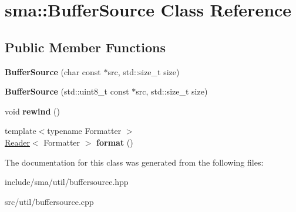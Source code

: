 \hypertarget{classsma_1_1BufferSource}{\section{sma\-:\-:Buffer\-Source Class Reference}
\label{classsma_1_1BufferSource}
}
\subsection*{Public Member Functions}
\begin{DoxyCompactItemize}
\item 
\hypertarget{classsma_1_1BufferSource_a569bd9f1682d325d25fb8a595ed6d4f3}{{\bfseries Buffer\-Source} (char const $\ast$src, std\-::size\-\_\-t size)}\label{classsma_1_1BufferSource_a569bd9f1682d325d25fb8a595ed6d4f3}

\item 
\hypertarget{classsma_1_1BufferSource_afb8306209ad2990a8edc352bf1122de5}{{\bfseries Buffer\-Source} (std\-::uint8\-\_\-t const $\ast$src, std\-::size\-\_\-t size)}\label{classsma_1_1BufferSource_afb8306209ad2990a8edc352bf1122de5}

\item 
\hypertarget{classsma_1_1BufferSource_aec1d4d3784327463959bf8cfbe72089a}{void {\bfseries rewind} ()}\label{classsma_1_1BufferSource_aec1d4d3784327463959bf8cfbe72089a}

\item 
\hypertarget{classsma_1_1BufferSource_a14d5bc5fb45b103366f232d18b8cc67d}{{\footnotesize template$<$typename Formatter $>$ }\\\hyperlink{classsma_1_1Reader}{Reader}$<$ Formatter $>$ {\bfseries format} ()}\label{classsma_1_1BufferSource_a14d5bc5fb45b103366f232d18b8cc67d}

\end{DoxyCompactItemize}


The documentation for this class was generated from the following files\-:\begin{DoxyCompactItemize}
\item 
include/sma/util/buffersource.\-hpp\item 
src/util/buffersource.\-cpp\end{DoxyCompactItemize}
